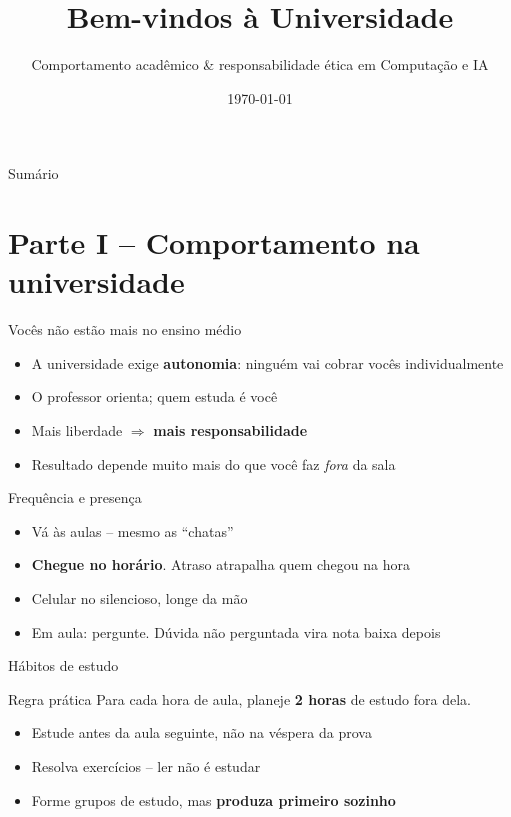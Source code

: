 \documentclass[aspectratio=169]{beamer}
\title{Bem-vindos \`a Universidade}
\author{Comportamento acad\^emico \& responsabilidade \'etica em Computa\c{c}\~ao e IA}
\date{\today}
\newcommand{\impt}[1]{\textcolor{maccent}{\textbf{#1}}}
\newcommand{\ntc}[1]{\textcolor{mprimary}{#1}}
\begin{document}
\begin{frame}[plain]\titlepage\end{frame}

\begin{frame}{Sum\'ario}
\tableofcontents
\end{frame}

\section{Parte I -- Comportamento na universidade}

\begin{frame}{Voc\^es n\~ao est\~ao mais no ensino m\'edio}
\begin{itemize}
  \item A universidade exige \impt{autonomia}: ningu\'em vai cobrar voc\^es individualmente
  \pause
  \item O professor \ntc{orienta}; quem estuda \'e voc\^e
  \pause
  \item Mais liberdade $\Rightarrow$ \impt{mais responsabilidade}
  \pause
  \item Resultado depende muito mais do que voc\^e faz \emph{fora} da sala
\end{itemize}
\end{frame}

\begin{frame}{Frequ\^encia e presen\c{c}a}
\begin{itemize}
  \item V\'a \`as aulas -- mesmo as ``chatas''
  \pause
  \item \impt{Chegue no hor\'ario}. Atraso atrapalha quem chegou na hora
  \pause
  \item Celular no silencioso, longe da m\~ao
  \pause
  \item Em aula: pergunte. D\'uvida n\~ao perguntada vira nota baixa depois
\end{itemize}
\end{frame}

\begin{frame}{H\'abitos de estudo}
\begin{block}{Regra pr\'atica}
Para cada hora de aula, planeje \impt{2 horas} de estudo fora dela.
\end{block}
\pause
\begin{itemize}
  \item Estude \ntc{antes} da aula seguinte, n\~ao na v\'espera da prova
  \pause
  \item Resolva exerc\'icios -- ler n\~ao \'e estudar
  \pause
  \item Forme grupos de estudo, mas \impt{produza primeiro sozinho}
\end{itemize}
\end{frame}
\end{document}

